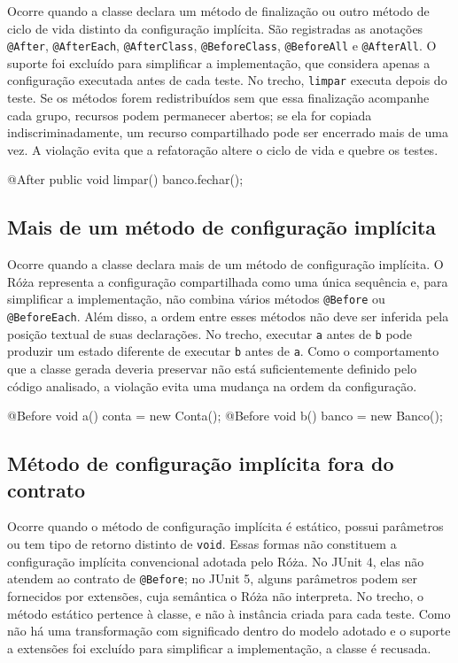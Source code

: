 Ocorre quando a classe declara um método de finalização ou outro método de ciclo de vida distinto da configuração implícita. São registradas as anotações \texttt{@After}, \texttt{@AfterEach}, \texttt{@AfterClass}, \texttt{@BeforeClass}, \texttt{@BeforeAll} e \texttt{@AfterAll}. O suporte foi excluído para simplificar a implementação, que considera apenas a configuração executada antes de cada teste. No trecho, \texttt{limpar} executa depois do teste. Se os métodos forem redistribuídos sem que essa finalização acompanhe cada grupo, recursos podem permanecer abertos; se ela for copiada indiscriminadamente, um recurso compartilhado pode ser encerrado mais de uma vez. A violação evita que a refatoração altere o ciclo de vida e quebre os testes.

\begin{violationexample}
@After public void limpar() { banco.fechar(); }
\end{violationexample}

\subsection{Mais de um método de configuração implícita}

Ocorre quando a classe declara mais de um método de configuração implícita. O Róża representa a configuração compartilhada como uma única sequência e, para simplificar a implementação, não combina vários métodos \texttt{@Before} ou \texttt{@BeforeEach}. Além disso, a ordem entre esses métodos não deve ser inferida pela posição textual de suas declarações. No trecho, executar \texttt{a} antes de \texttt{b} pode produzir um estado diferente de executar \texttt{b} antes de \texttt{a}. Como o comportamento que a classe gerada deveria preservar não está suficientemente definido pelo código analisado, a violação evita uma mudança na ordem da configuração.

\begin{violationexample}
@Before void a() { conta = new Conta(); }
@Before void b() { banco = new Banco(); }
\end{violationexample}

\subsection{Método de configuração implícita fora do contrato}

Ocorre quando o método de configuração implícita é estático, possui parâmetros ou tem tipo de retorno distinto de \texttt{void}. Essas formas não constituem a configuração implícita convencional adotada pelo Róża. No JUnit 4, elas não atendem ao contrato de \texttt{@Before}; no JUnit 5, alguns parâmetros podem ser fornecidos por extensões, cuja semântica o Róża não interpreta. No trecho, o método estático pertence à classe, e não à instância criada para cada teste. Como não há uma transformação com significado dentro do modelo adotado e o suporte a extensões foi excluído para simplificar a implementação, a classe é recusada.

